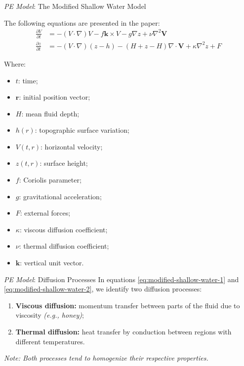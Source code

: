 \begin{frame}{\textit{PE Model}: The Modified Shallow Water Model}
	\begin{small}
		The following equations are presented in the paper:
		\begin{align}
			\frac{\partial V}{\partial t} & = - ( V \cdot \nabla)V - f \mathbf{k} \times V - g \nabla z + \nu \nabla^2\mathbf{V} \label{eq:modified-shallow-water-1}     \\
			\frac{\partial z}{\partial t} & = - (V \cdot \nabla)(z - h) - (H + z - H)\nabla \cdot \mathbf{V} + \kappa \nabla^2 z + F \label{eq:modified-shallow-water-2} 
		\end{align}
	\end{small}
	\begin{scriptsize}
		Where:
		\begin{multicols}{2}
			\begin{itemize}
				\item $t$: time;
				\item $\mathbf{r}$: initial position vector;
				\item $H$: mean fluid depth;
				\item $h(r)$: topographic surface variation;
				\item $V(t,r)$: horizontal velocity;
				\item $z(t,r)$: surface height;
				\item $f$: Coriolis parameter;
				\item $g$: gravitational acceleration;
				\item $F$: external forces;
				\item $\kappa$: viscous diffusion coefficient;
				\item $\nu$: thermal diffusion coefficient;
				\item $\mathbf{k}$: vertical unit vector.
			\end{itemize}
		\end{multicols}
	\end{scriptsize}
\end{frame}


\begin{frame}{\textit{PE Model}: Diffusion Processes}
	In equations \eqref{eq:modified-shallow-water-1} and \eqref{eq:modified-shallow-water-2}, we identify two diffusion processes:
	\begin{enumerate}
		\item \textbf{Viscous diffusion:} momentum transfer between parts of the fluid due to viscosity \textit{(e.g., honey)};
		\item \textbf{Thermal diffusion:} heat transfer by conduction between regions with different temperatures.
	\end{enumerate}
			
	\begin{small}
		\textit{Note: Both processes tend to homogenize their respective properties.}
	\end{small}
\end{frame}

